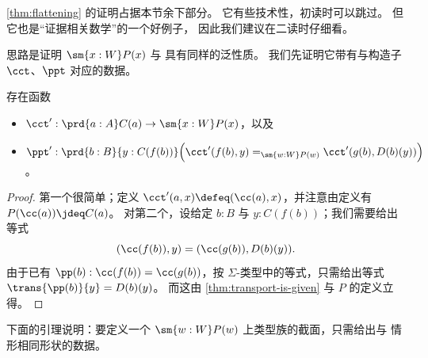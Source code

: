\cref{thm:flattening} 的证明占据本节余下部分。
它有些技术性，初读时可以跳过。
但它也是“证据相关数学”的一个好例子，
%
因此我们建议在二读时仔细看。

思路是证明 $\sm{x:W} P(x)$ 与 \Wtil 具有同样的泛性质。
我们先证明它带有与构造子 $\cct$、$\ppt$ 对应的数据。

\begin{lem}\label{thm:flattening-cp}
  存在函数
  \begin{itemize}
  \item $\cct':\prd{a:A} C(a) \to \sm{x:W} P(x)$，以及
  \item $\ppt':\prd{b:B}{y:C(f(b))} \Big(\cct'(f(b),y)=_{\sm{w:W}P(w)}\cct'(g(b),D(b)(y))\Big)$。
  \end{itemize}
\end{lem}
\begin{proof}
  第一个很简单；定义 $\cct'(a,x) \defeq (\cc(a),x)$，并注意由定义有 $P(\cc(a))\jdeq C(a)$。
  对第二个，设给定 $b:B$ 与 $y:C(f(b))$；我们需要给出等式
  \[ (\cc(f(b)),y) = (\cc(g(b)),D(b)(y)). \]
  由于已有 $\pp(b):\cc(f(b))=\cc(g(b))$，按 $\Sigma$-类型中的等式，只需给出等式 $\trans{\pp(b)}{y} = D(b)(y)$。
  而这由 \cref{thm:transport-is-given} 与 $P$ 的定义立得。
\end{proof}

下面的引理说明：要定义一个 $\sm{w:W} P(w)$ 上类型族的截面，只需给出与 \Wtil 情形相同形状的数据。

